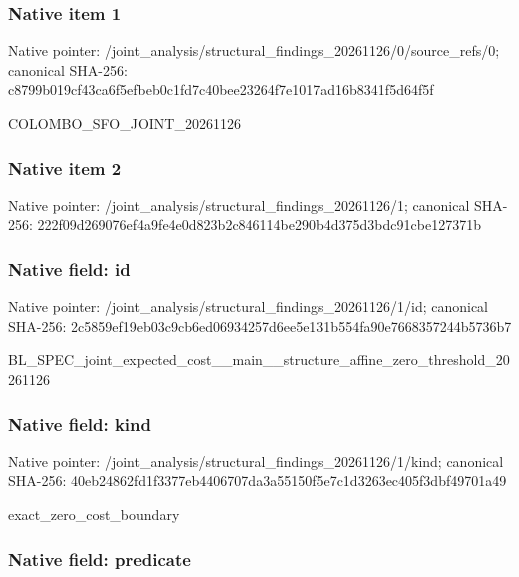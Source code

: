 \documentclass[10pt,a4paper]{article}
\begin{document}
\subsubsection{Native item 1}


Native pointer: /joint\_analysis/structur\allowbreak{}al\_findings\_20261126/0/s\allowbreak{}ource\_refs/0; canonical SHA-256: c8799b019cf43ca6f5efbeb0\allowbreak{}c1fd7c40bee23264f7e1017a\allowbreak{}d16b8341f5d64f5f


COLOMBO\_SFO\_JOINT\_20261126


\subsubsection{Native item 2}


Native pointer: /joint\_analysis/structur\allowbreak{}al\_findings\_20261126/1; canonical SHA-256: 222f09d269076ef4a9fe4e0d\allowbreak{}823b2c846114be290b4d375d\allowbreak{}3bdc91cbe127371b



\subsubsection{Native field: id}


Native pointer: /joint\_analysis/structur\allowbreak{}al\_findings\_20261126/1/i\allowbreak{}d; canonical SHA-256: 2c5859ef19eb03c9cb6ed069\allowbreak{}34257d6ee5e131b554fa90e7\allowbreak{}668357244b5736b7


BL\_SPEC\_joint\_expected\_c\allowbreak{}ost\_\_main\_\_structure\_aff\allowbreak{}ine\_zero\_threshold\_20261\allowbreak{}126


\subsubsection{Native field: kind}


Native pointer: /joint\_analysis/structur\allowbreak{}al\_findings\_20261126/1/k\allowbreak{}ind; canonical SHA-256: 40eb24862fd1f3377eb44067\allowbreak{}07da3a55150f5e7c1d3263ec\allowbreak{}405f3dbf49701a49


exact\_zero\_cost\_boundary


\subsubsection{Native field: predicate}
\end{document}

